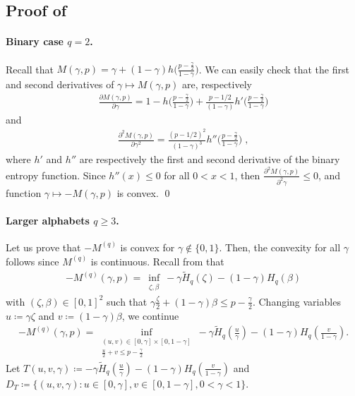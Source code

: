 \documentclass{article}
\theoremstyle{plain}
\theoremstyle{plain}
\theoremstyle{plain}
\theoremstyle{plain}
\theoremstyle{plain}
\theoremstyle{plain}
\theoremstyle{plain}
\theoremstyle{plain}
\theoremstyle{plain}
\theoremstyle{plain}
\theoremstyle{remark}
\theoremstyle{remark}
\theoremstyle{remark}
\theoremstyle{plain}
\begin{document}
\subsection{Proof of }

\paragraph{Binary case $q=2$.}
        Recall that $M(\gamma,p)=\gamma+(1-\gamma)h\Big(\frac{p-\frac{\gamma}{2}}{1-\gamma}\Big)$. We can easily check that the first and second derivatives of $\gamma\mapsto M(\gamma,p)$ are, respectively
        \begin{align*}
            \frac{\partial M(\gamma,p)}{\partial\gamma}=1-h\Big(\frac{p-\frac{\gamma}{2}}{1-\gamma}\Big)
            +\frac{p-1/2}{(1-\gamma)}h'\Big(\frac{p-\frac{\gamma}{2}}{1-\gamma}\Big)
        \end{align*} and
        \begin{align*}
           \frac{\partial^2 M(\gamma,p)}{\partial\gamma^2}=\frac{(p-1/2)^2}{(1-\gamma)^3}h''\Big(\frac{p-\frac{\gamma}{2}}{1-\gamma}\Big)\;,
        \end{align*}
        where $h'$ and $h''$ are respectively the first and second derivative of the binary entropy function. Since $h''(x)\le 0$ for all $0<x<1$, then $\frac{\partial^2 M(\gamma,p)}{\partial^2\gamma}\le 0$, and function $\gamma\mapsto -M(\gamma,p)$ is convex.
        \qed

\paragraph{Larger alphabets $q\ge 3$.}
Let us prove that $-M^{(q)}$ is convex
for $\gamma\notin\{0,1\}$. Then, the convexity
for all $\gamma$ follows since $M^{(q)}$
is continuous.
Recall from  that
\begin{align*}
      - M^{(q)}(\gamma,p)= \underset{\substack{\zeta,\beta}}{\inf}-\gamma\tilde{H}_q(\zeta)-(1-\gamma)H_q(\beta)
\end{align*}
    with $(\zeta,\beta)\in[0,1]^2$ such that $\gamma\frac{\zeta}{2}+(1-\gamma)\beta\le p-\frac{\gamma}{2}$. Changing variables $u\coloneqq\gamma\zeta$ and $v\coloneqq(1-\gamma)\beta$, we continue 
    \begin{align*}
         -M^{(q)}(\gamma,p)= \underset{\substack{(u,v)\in [0,\gamma]\times[0,1-\gamma]\\ \frac{u}{2}+v\le p-\frac{\gamma}{2}}}{\inf}-\gamma\tilde{H}_q\left(\frac{u}{\gamma}\right)-(1-\gamma)H_q\left(\frac{v}{1-\gamma}\right).
    \end{align*}
Let $T(u,v,\gamma)\coloneqq-\gamma\tilde{H}_q(\frac{u}{\gamma})-(1-\gamma)H_q(\frac{v}{1-\gamma})$ and $D_T\coloneqq\{(u,v,\gamma): u\in[0,\gamma], v\in [0,1-\gamma], 0<\gamma<1\}$. 
\end{document}
